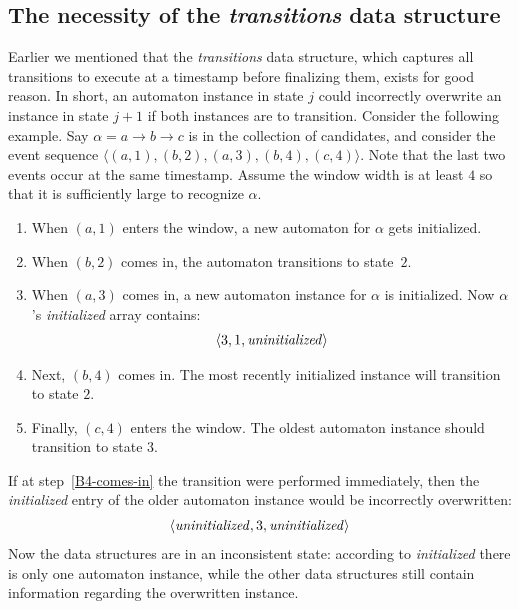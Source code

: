 \subsection{The necessity of the \emph{transitions} data structure}
\label{sec:transitions}

Earlier we mentioned that the \emph{transitions} data structure, which captures all transitions to execute at a timestamp before finalizing them, exists for good reason. In short, an automaton instance in state $ j $ could incorrectly overwrite an instance in state $ j + 1 $ if both instances are to transition. Consider the following example. Say $ \alpha = a \to b \to c $ is in the collection of candidates, and consider the event sequence $ \langle (a, 1),\allowbreak(b, 2),\allowbreak(a, 3),\allowbreak(b, 4),\allowbreak(c, 4) \rangle $. Note that the last two events occur at the same timestamp. Assume the window width is at least $ 4 $ so that it is sufficiently large to recognize $ \alpha $.

\begin{enumerate}
\item When $ (a, 1) $ enters the window, a new automaton for $ \alpha $ gets initialized.
\item When $ (b, 2) $ comes in, the automaton transitions to state~$ 2 $.
\item When $ (a, 3) $ comes in, a new automaton instance for $ \alpha $ is initialized. Now $ \alpha $'s \emph{initialized} array contains:
\begin{align*}
\langle 3, 1, \text{\textit{uninitialized}} \rangle
\end{align*}
\item Next, $ (b, 4) $ comes in. The most recently initialized instance will transition to state $ 2 $. \label{B4-comes-in}
\item Finally, $ (c, 4) $ enters the window. The oldest automaton instance should transition to state $ 3 $.
\end{enumerate}

If at step~\ref{B4-comes-in} the transition were performed immediately, then the \emph{initialized} entry of the older automaton instance would be incorrectly overwritten:
\begin{align*}
\langle \text{\textit{uninitialized}}, 3, \text{\textit{uninitialized}} \rangle
\end{align*}
Now the data structures are in an inconsistent state: according to \emph{initialized} there is only one automaton instance, while the other data structures still contain information regarding the overwritten instance.

